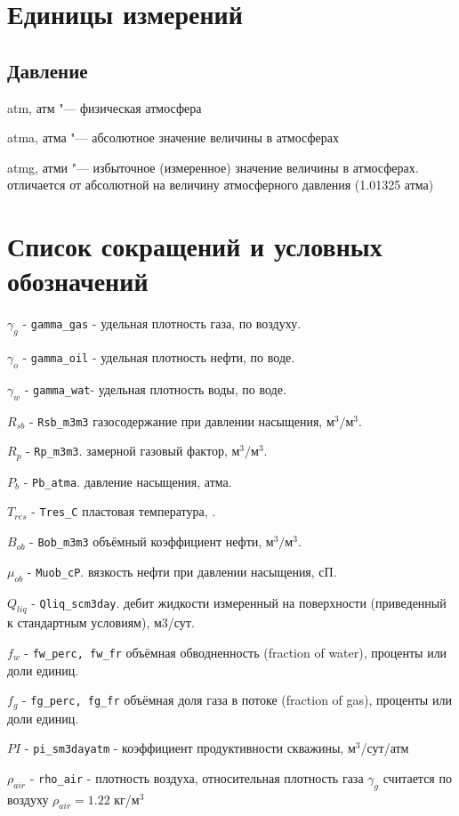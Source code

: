 \chapter*{Единицы измерений} %
\noindent

\section*{Давление}
 
 atm, атм "--- физическая атмосфера 
 
 atma, атма "--- абсолютное значение величины в атмосферах
 
 atmg, атми "--- избыточное (измеренное) значение величины в атмосферах. отличается от абсолютной на величину атмосферного давления (1.01325 атма)

\chapter*{Список сокращений и условных обозначений} %
\noindent

$\gamma_g$  - \texttt{gamma_gas} - удельная плотность газа, по воздуху. 

$\gamma_o$  - \texttt{gamma_oil} - удельная плотность нефти, по воде.

$\gamma_w$  - \texttt{gamma_wat}- удельная плотность воды, по воде. 

$R_{sb}$ - \texttt{Rsb_m3m3} газосодержание при давлении насыщения,  $\text{м}^3/\text{м}^3$. 

$R_p$ - \texttt{Rp_m3m3}. замерной газовый фактор, $\text{м}^3/\text{м}^3$.

$P_b$ - \texttt{Pb_atma}. давление насыщения, атма.  

$T_{res}$ - \texttt{Tres_C} пластовая температура, \textcelsius. 

$B_{ob}$ - \texttt{Bob_m3m3} объёмный коэффициент нефти,  $\text{м}^3/\text{м}^3$. 

$\mu_{ob}$ - \texttt{Muob_cP}. вязкость нефти при давлении насыщения, сП. 

$Q_{liq}$ - \texttt{Qliq_scm3day}. дебит жидкости измеренный на поверхности (приведенный к стандартным условиям), м3/сут. 

$f_{w}$ - \texttt{fw_perc, fw_fr} объёмная обводненность (fraction of water), проценты или доли единиц. 

$f_{g}$ - \texttt{fg_perc, fg_fr} объёмная доля газа в потоке (fraction of gas), проценты или доли единиц. 

$PI$ - \texttt{pi_sm3dayatm} - коэффициент продуктивности скважины, $\text{м}^3$/сут/атм

$\rho_{air}$ - \texttt{rho_air} - плотность воздуха, относительная плотность газа $\gamma_g$ считается по воздуху $\rho_{air} = 1.22$ кг/$\text{м}^3$